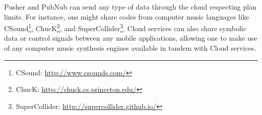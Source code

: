 Pusher and PubNub can send any type of data through the cloud respecting plan limits.
For instance, one might share codes from computer music languages like CSound\footnote{CSound: \url{http://www.csounds.com/}}, ChucK\footnote{ChucK: \url{http://chuck.cs.princeton.edu/}}, and SuperCollider\footnote{SuperCollider: \url{http://supercollider.github.io/}}.
Cloud services can also share symbolic data or control signals between any mobile applications, allowing one to make use of any computer music synthesis engines available in tandem with Cloud services.

